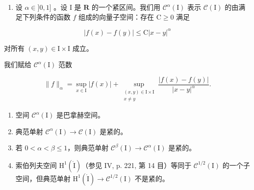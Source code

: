 \begin{enumerate}
\def\labelenumi{\arabic{enumi})}
\setcounter{enumi}{3}
\tightlist
\item
  设 \(\alpha \in ]0,1]\) 。设 I 是 \(\mathbf{R}\) 的一个紧区间。我们用 \(\mathcal{C}^{\alpha}(\mathrm{I})\) 表示 \(\mathcal{C}(\mathrm{I})\) 的由满足下列条件的函数 \(f\) 组成的向量子空间：存在 \(\mathrm{C} \geqslant 0\) 满足
\end{enumerate}

\[
| f (x) - f (y) | \leqslant \mathrm{C} | x - y | ^ {\alpha}
\]

对所有 \((x,y)\in\mathrm{I}\times\mathrm{I}\) 成立。

我们赋给 \(\mathcal{C}^{\alpha}(\mathrm{I})\) 范数

\[
\| f\|_{\alpha} = \sup_{x\in \mathrm{I}}|f(x)| + \sup_{\substack{(x,y)\in \mathrm{I}\times \mathrm{I}\\ x\neq y}}\frac{|f(x) - f(y)|}{|x - y|^{\alpha}}.
\]

\begin{enumerate}
\def\labelenumi{\alph{enumi})}
\item
  空间 \(\mathcal{C}^{\alpha}(\mathrm{I})\) 是巴拿赫空间。
\item
  典范单射 \(\mathcal{C}^{\alpha}(\mathrm{I})\to \mathcal{C}(\mathrm{I})\) 是紧的。
\item
  若 \(0 < \alpha < \beta \leqslant 1\)，则典范单射 \(\mathcal{C}^{\beta}(\mathrm{I}) \to \mathcal{C}^{\alpha}(\mathrm{I})\) 是紧的。\\
\item
  索伯列夫空间 \(\mathrm{H}^{1}(\mathring{\mathrm{I}})\)（参见 IV, p. 221, 第 14 目）等同于 \(\mathcal{C}^{1/2}(\mathrm{I})\) 的一个子空间，但典范单射 \(\mathrm{H}^{1}(\mathring{\mathrm{I}}) \to \mathcal{C}^{1/2}(\mathrm{I})\) 不是紧的。
\end{enumerate}

